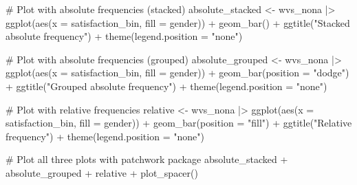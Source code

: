 \documentclass[
  letterpaper,
]{krantz}
\makeatletter
\newenvironment{Shaded}{\begin{snugshade}}{\end{snugshade}}
\newcommand{\AttributeTok}[1]{\textcolor[rgb]{0.40,0.45,0.13}{#1}}
\newcommand{\CommentTok}[1]{\textcolor[rgb]{0.37,0.37,0.37}{#1}}
\newcommand{\FunctionTok}[1]{\textcolor[rgb]{0.28,0.35,0.67}{#1}}
\newcommand{\NormalTok}[1]{\textcolor[rgb]{0.00,0.23,0.31}{#1}}
\newcommand{\OtherTok}[1]{\textcolor[rgb]{0.00,0.23,0.31}{#1}}
\newcommand{\SpecialCharTok}[1]{\textcolor[rgb]{0.37,0.37,0.37}{#1}}
\newcommand{\StringTok}[1]{\textcolor[rgb]{0.13,0.47,0.30}{#1}}
\newenvironment{kframe}{%
\medskip{}
\setlength{\fboxsep}{.8em}
 \def\at@end@of@kframe{}%
 \ifinner\ifhmode%
  \def\at@end@of@kframe{\end{minipage}}%
  \begin{minipage}{\columnwidth}%
 \fi\fi%
 \def\FrameCommand##1{\hskip\@totalleftmargin \hskip-\fboxsep
 \colorbox{shadecolor}{##1}\hskip-\fboxsep
     \hskip-\linewidth \hskip-\@totalleftmargin \hskip\columnwidth}%
 \MakeFramed {\advance\hsize-\width
   \@totalleftmargin\z@ \linewidth\hsize
   \@setminipage}}%
 {\par\unskip\endMakeFramed%
 \at@end@of@kframe}
\renewenvironment{Shaded}{\begin{kframe}}{\end{kframe}}
\makeatother
\begin{document}
\begin{Shaded}
\begin{Highlighting}[]
\CommentTok{\# Plot with absolute frequencies (stacked)}
\NormalTok{absolute\_stacked }\OtherTok{\textless{}{-}}
\NormalTok{  wvs\_nona }\SpecialCharTok{|\textgreater{}}
  \FunctionTok{ggplot}\NormalTok{(}\FunctionTok{aes}\NormalTok{(}\AttributeTok{x =}\NormalTok{ satisfaction\_bin,}
             \AttributeTok{fill =}\NormalTok{ gender)) }\SpecialCharTok{+}
  \FunctionTok{geom\_bar}\NormalTok{() }\SpecialCharTok{+}
  \FunctionTok{ggtitle}\NormalTok{(}\StringTok{"Stacked absolute frequency"}\NormalTok{) }\SpecialCharTok{+}
  \FunctionTok{theme}\NormalTok{(}\AttributeTok{legend.position =} \StringTok{"none"}\NormalTok{)}

\CommentTok{\# Plot with absolute frequencies (grouped)}
\NormalTok{absolute\_grouped }\OtherTok{\textless{}{-}}
\NormalTok{  wvs\_nona }\SpecialCharTok{|\textgreater{}}
  \FunctionTok{ggplot}\NormalTok{(}\FunctionTok{aes}\NormalTok{(}\AttributeTok{x =}\NormalTok{ satisfaction\_bin,}
             \AttributeTok{fill =}\NormalTok{ gender)) }\SpecialCharTok{+}
  \FunctionTok{geom\_bar}\NormalTok{(}\AttributeTok{position =} \StringTok{"dodge"}\NormalTok{) }\SpecialCharTok{+}
  \FunctionTok{ggtitle}\NormalTok{(}\StringTok{"Grouped absolute frequency"}\NormalTok{) }\SpecialCharTok{+}
  \FunctionTok{theme}\NormalTok{(}\AttributeTok{legend.position =} \StringTok{"none"}\NormalTok{)}

\CommentTok{\# Plot with relative frequencies}
\NormalTok{relative }\OtherTok{\textless{}{-}}
\NormalTok{  wvs\_nona }\SpecialCharTok{|\textgreater{}}
  \FunctionTok{ggplot}\NormalTok{(}\FunctionTok{aes}\NormalTok{(}\AttributeTok{x =}\NormalTok{ satisfaction\_bin,}
             \AttributeTok{fill =}\NormalTok{ gender)) }\SpecialCharTok{+}
  \FunctionTok{geom\_bar}\NormalTok{(}\AttributeTok{position =} \StringTok{"fill"}\NormalTok{) }\SpecialCharTok{+}
  \FunctionTok{ggtitle}\NormalTok{(}\StringTok{"Relative frequency"}\NormalTok{) }\SpecialCharTok{+}
  \FunctionTok{theme}\NormalTok{(}\AttributeTok{legend.position =} \StringTok{"none"}\NormalTok{)}

\CommentTok{\# Plot all three plots with \textquotesingle{}patchwork\textquotesingle{} package}
\NormalTok{absolute\_stacked }\SpecialCharTok{+}\NormalTok{ absolute\_grouped }\SpecialCharTok{+}\NormalTok{ relative }\SpecialCharTok{+} \FunctionTok{plot\_spacer}\NormalTok{()}
\end{Highlighting}
\end{Shaded}
\end{document}
